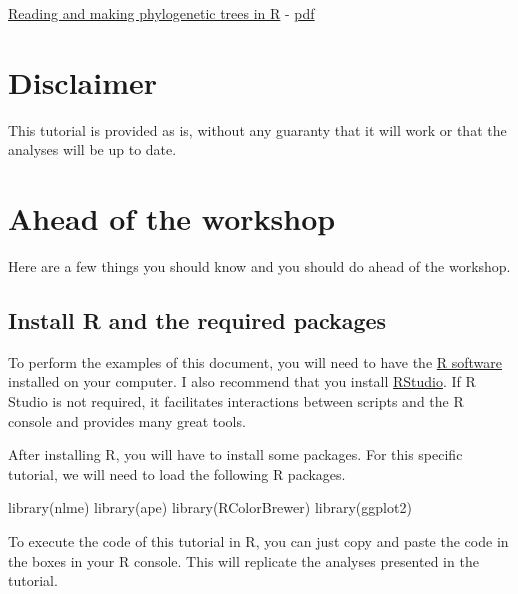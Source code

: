 \documentclass[
]{book}
\newenvironment{Shaded}{\begin{snugshade}}{\end{snugshade}}
\newcommand{\FunctionTok}[1]{\textcolor[rgb]{0.00,0.00,0.00}{#1}}
\newcommand{\NormalTok}[1]{#1}
\begin{document}
\href{http://htmlpreview.github.com/?http://github.com/simjoly/CourseComparativeMethods/blob/master/lecture2/PhylogeneticTree.html}{Reading and making phylogenetic trees in R} - \href{http://github.com/simjoly/CourseComparativeMethods/blob/master/lecture2/PhylogeneticTree.pdf}{pdf}

\hypertarget{disclaimer}{%
\chapter{Disclaimer}\label{disclaimer}}

This tutorial is provided as is, without any guaranty that it will work or that the analyses will be up to date.

\hypertarget{before}{%
\chapter{Ahead of the workshop}\label{before}}

Here are a few things you should know and you should do ahead of the workshop.

\hypertarget{install-r-and-the-required-packages}{%
\section{Install R and the required packages}\label{install-r-and-the-required-packages}}

To perform the examples of this document, you will need to have the \href{https://www.r-project.org/}{R software} installed on your computer. I also recommend that you install \href{https://rstudio.com/}{RStudio}. If R Studio is not required, it facilitates interactions between scripts and the R console and provides many great tools.

After installing R, you will have to install some packages. For this specific tutorial, we will need to load the following R packages.

\begin{Shaded}
\begin{Highlighting}[]
\FunctionTok{library}\NormalTok{(nlme)}
\FunctionTok{library}\NormalTok{(ape)}
\FunctionTok{library}\NormalTok{(RColorBrewer)}
\FunctionTok{library}\NormalTok{(ggplot2)}
\end{Highlighting}
\end{Shaded}

To execute the code of this tutorial in R, you can just copy and paste the code in the boxes in your R console. This will replicate the analyses presented in the tutorial.
\end{document}
